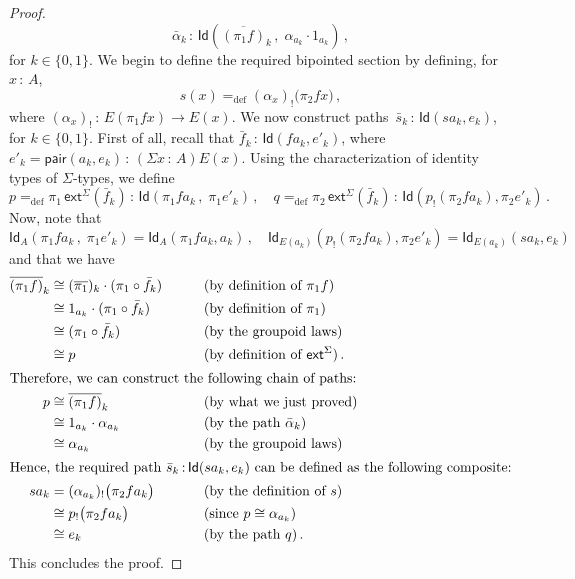 \documentclass[10pt,a4paper,oneside,reqno]{amsart}
\numberwithin{equation}{section}
\theoremstyle{mythm}
\theoremstyle{mydef}
\theoremstyle{myrmk}
\newcommand{\deq}{=}
\newcommand{\defeq}{=_{\mathrm{def}}}
\newcommand{\co}{\,{:}\,}
\newcommand{\iso}{\cong}
\newcommand{\ct}{\cdot}
\newcommand{\ext}{\mathsf{ext}}
\newcommand{\Id}{\mathsf{Id}}
\newcommand{\pair}{\mathsf{pair}}
\begin{document}
\begin{proof}
\begin{equation*}
\bar{\alpha}_k \co  \Id( \overline{(\pi_1  f)}_k \, , \;  \alpha_{a_k} \cdot 1_{a_k} ) \, ,
\end{equation*}
for $k \in \{ 0, 1 \}$. We begin to define the required bipointed section by defining, for~$x \co A$, 
\begin{equation*}
s(x) \defeq (\alpha_x)_{!} \big( \pi_2 f  x \big) \, ,
\end{equation*}
where $(\alpha_x)_{!} \co E(\pi_1 f x) \to E(x)$. 
We now construct  paths~$\bar{s}_k \co \Id(s a_k, e_k)$, for $k \in \{ 0, 1 \}$. First of all, recall that 
$\bar{f}_k \co \Id( f a_k, e'_k)$, where $e'_k = \pair(a_k, e_k) \co (\Sigma x \co A) E(x)$. Using the 
characterization of identity types of $\Sigma$-types, we define
\[
p \defeq \pi_1 \, \ext^\Sigma(\bar{f}_k)  \co  \Id( \pi_1 f  a_k \, ,\;   \pi_1 e'_k )  \, ,  \quad 
q \defeq  \pi_2 \, \ext^\Sigma(\bar{f}_k) \co   \Id( p_{!}( \pi_2 f  a_k), \pi_2 e'_k)   \, .
\]
Now, note that
\[
 \Id_A( \pi_1 f  a_k \, ,\;   \pi_1 e'_k )  = \Id_A(\pi_1 f a_k, a_k) \, , \quad 
 \Id_{E(a_k)}( p_{!}( \pi_2 f  a_k), \pi_2 e'_k)  = \Id_{E(a_k)}( sa_k, e_k) 
 \]
and that we have 
\begin{alignat*}{4}  
\overline{(\pi_1  f)}_k  & \iso  (\overline{\pi_1})_k \ct (\pi_1 \circ \bar{f}_k)  & & \qquad (\text{by definition of } \pi_1 f)   \\
& \iso  1_{a_k}  \ct (\pi_1 \circ \bar{f}_k)  & & \qquad (\text{by definition of } \pi_1)  \\
 & \iso (\pi_1 \circ \bar{f}_k) & & \qquad (\text{by the groupoid laws}) \\
 & \iso p  & & \qquad (\text{by definition of } \ext^\Sigma) \,  . \\
 \intertext{Therefore, we can construct the following chain of paths:}
p & \iso  \overline{(\pi_1 f)}_k & &  \qquad (\text{by what we just proved})  \\
  & \iso 1_{a_k} \ct  \alpha_{a_k}  & &  \qquad (\text{by the path } \bar{\alpha}_k ) \\ 
  & \iso  \alpha_{a_k}  & & \qquad (\text{by the groupoid laws}) \\
\intertext{Hence,  the required path $\bar{s}_k \co  \Id(s a_k,  e_k)$ can be defined as the following composite:}
s a_k & \deq (\alpha_{a_k})_{!} \big( \pi_2 f a_k   \big) & & \qquad (\text{by the definition of } s) \\
 &              \iso  p_{!} \big( \pi_2 f a_k   \big) & & \qquad (\text{since } p  \iso \alpha_{a_k}) \\
   &            \iso  e_k  & &  \qquad (\text{by the path } q)  \, .
   \end{alignat*} 
   This concludes the proof.
\end{proof}
\end{document}
